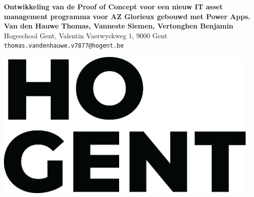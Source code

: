 \documentclass[a0,portrait]{a0poster}
\begin{document}


\begin{minipage}[t]{0.75\linewidth}
\VeryHuge \color{HoGentAccent1} \textbf{Ontwikkeling van de Proof of Concept voor een nieuw IT asset management programma voor AZ Glorieux gebouwd met Power Apps.} \color{Black}\\ %

\huge \textbf{Van den Hauwe Thomas, Vanneste Siemen, Vertonghen Benjamin}\\[0.5cm] %
\huge Hogeschool Gent, Valentin Vaerwyckweg 1, 9000 Gent\\[0.4cm] %
\Large \texttt{thomas.vandenhauwe.v7877@hogent.be} \\
\end{minipage}
%
\begin{minipage}[t]{0.25\linewidth}
\includegraphics[width=13cm,right]{figures/HOGENT_Logo_Pos_rgb.png} 

\end{minipage}

\vspace{1cm} %
\end{document}
